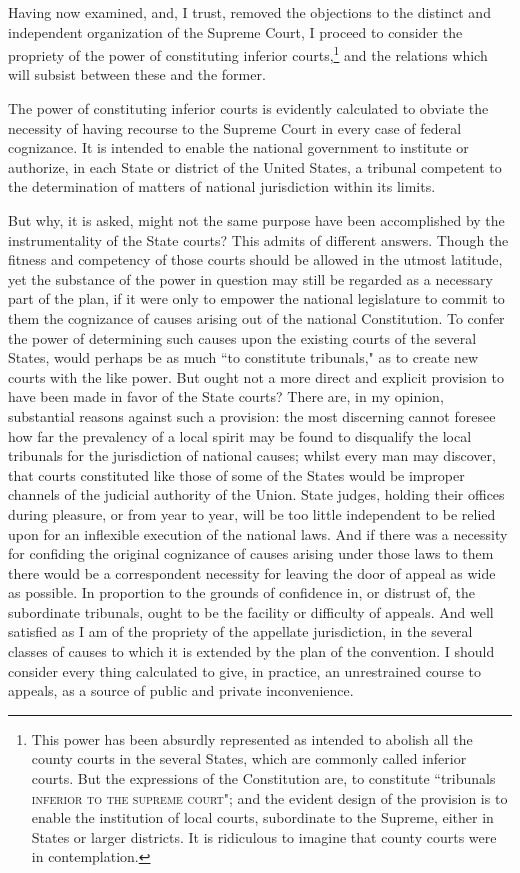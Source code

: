 Having now examined, and, I trust, removed the objections to the distinct and independent organization of the Supreme Court, I proceed to consider the propriety of the power of constituting inferior courts,\footnote{This power has been absurdly represented as intended to abolish all the county courts in the several States, which are commonly called inferior courts. 
But the expressions of the Constitution are, to constitute ``tribunals \textsc{inferior to the supreme court}"; and the evident design of the provision is to enable the institution of local courts, subordinate to the Supreme, either in States or larger districts. 
It is ridiculous to imagine that county courts were in contemplation.} and the relations which will subsist between these and the former.

The power of constituting inferior courts is evidently calculated to obviate the necessity of having recourse to the Supreme Court in every case of federal cognizance. 
It is intended to enable the national government to institute or authorize, in each State or district of the United States, a tribunal competent to the determination of matters of national jurisdiction within its limits.

But why, it is asked, might not the same purpose have been accomplished by the instrumentality of the State courts? 
This admits of different answers. 
Though the fitness and competency of those courts should be allowed in the utmost latitude, yet the substance of the power in question may still be regarded as a necessary part of the plan, if it were only to empower the national legislature to commit to them the cognizance of causes arising out of the national Constitution. 
To confer the power of determining such causes upon the existing courts of the several States, would perhaps be as much ``to constitute tribunals," as to create new courts with the like power. 
But ought not a more direct and explicit provision to have been made in favor of the State courts? 
There are, in my opinion, substantial reasons against such a provision: the most discerning cannot foresee how far the prevalency of a local spirit may be found to disqualify the local tribunals for the jurisdiction of national causes; whilst every man may discover, that courts constituted like those of some of the States would be improper channels of the judicial authority of the Union. 
State judges, holding their offices during pleasure, or from year to year, will be too little independent to be relied upon for an inflexible execution of the national laws. 
And if there was a necessity for confiding the original cognizance of causes arising under those laws to them there would be a correspondent necessity for leaving the door of appeal as wide as possible. 
In proportion to the grounds of confidence in, or distrust of, the subordinate tribunals, ought to be the facility or difficulty of appeals. 
And well satisfied as I am of the propriety of the appellate jurisdiction, in the several classes of causes to which it is extended by the plan of the convention. 
I should consider every thing calculated to give, in practice, an unrestrained course to appeals, as a source of public and private inconvenience.

